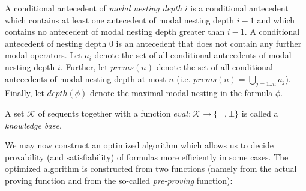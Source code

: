 \documentclass{entcs} \usepackage{entcsmacro}
\newcommand{\prems}{\mathit{prems}}
\newcommand{\eval}{\mathit{eval}}
\begin{document}
\begin{definition}
A conditional antecedent of \emph{modal nesting depth} $i$ is a
conditional antecedent which contains at least one antecedent of
modal nesting depth $i-1$ and which contains no antecedent 
of modal nesting depth greater than $i-1$. A
conditional antecedent of nesting depth 0 is an antecedent
that does not contain any further modal operators.
Let $a_i$ denote the set of all conditional antecedents of modal
nesting depth $i$. Further, let $\prems(n)$ denote the set of all
conditional antecedents of modal nesting depth at most $n$ (i.e.
$\prems(n)=\bigcup_{j=1..n}^{} a_j$).
Finally, let $depth(\phi)$ denote the maximal modal nesting in
the formula $\phi$.
\end{definition}


\begin{definition}
  A set $\mathcal{K}$ of sequents together with a function
  $\eval:\mathcal{K}\rightarrow \{\top,\bot\}$ is called
  a \emph{knowledge base}.
\end{definition}

\noindent We may now construct an optimized algorithm which allows us
to decide provability (and satisfiability) of formulas more
efficiently in some cases. The optimized algorithm is constructed from
two functions (namely from the actual proving function and from the
so-called \emph{pre-proving} function):
\end{document}
